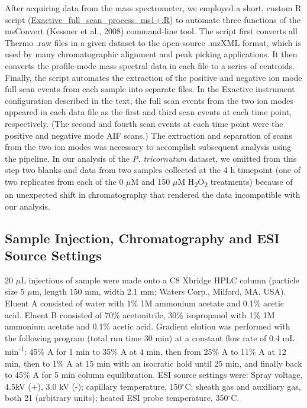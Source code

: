 After acquiring data from the mass spectrometer, we employed a short, custom R script (\href{https://github.com/vanmooylipidomics/LipidomicsToolbox/blob/master/Exactive_full_scan_process_ms1+.r}{Exactive\_full\_scan\_process\_ms1+.R}) to automate three functions of the msConvert (Kessner et al., 2008) command-line tool. The script first converts all Thermo .raw files in a given dataset to the open-source .mzXML format, which is used by many chromatographic alignment and peak picking applications. It then converts the profile-mode mass spectral data in each file to a series of centroids. Finally, the script automates the extraction of the positive and negative ion mode full scan events from each sample into separate files. In the Exactive instrument configuration described in the text, the full scan events from the two ion modes appeared in each data file as the first and third scan events at each time point, respectively. (The second and fourth scan events at each time point were the positive and negative mode AIF scans.) The extraction and separation of scans from the two ion modes was necessary to accomplish subsequent analysis using the pipeline. In our analysis of the \emph{P. tricornutum} dataset, we omitted from this step two blanks and data from two samples collected at the 4 h timepoint (one of two replicates from each of the 0 $\mu$M and 150 $\mu$M H\textsubscript{2}O\textsubscript{2} treatments) because of an unexpected shift in chromatography that rendered the data incompatible with our analysis.

\subsection{Sample Injection, Chromatography and ESI Source Settings}
\label{ssec:Sample Injection, Chromatography and ESI Source Settings}

20 $\mu$L injections of sample were made onto a C8 Xbridge HPLC column (particle size 5 $\mu$m, length 150 mm, width 2.1 mm; Waters Corp., Milford, MA, USA). Eluent A consisted of water with 1\% 1M ammonium acetate and 0.1\% acetic acid. Eluent B consisted of 70\% acetonitrile, 30\% isopropanol with 1\% 1M ammonium acetate and 0.1\% acetic acid. Gradient elution was performed with the following program (total run time 30 min) at a constant flow rate of 0.4 mL min\textsuperscript{-1}: 45\% A for 1 min to 35\% A at 4 min, then from 25\% A to 11\% A at 12 min, then to 1\% A at 15 min with an isocratic hold until 25 min, and finally back to 45\% A for 5 min column equilibration. ESI source settings were: Spray voltage, 4.5kV (+), 3.0 kV (-); capillary temperature, 150$^{\circ}$C; sheath gas and auxiliary gas, both 21 (arbitrary units); heated ESI probe temperature, 350$^{\circ}$C.

